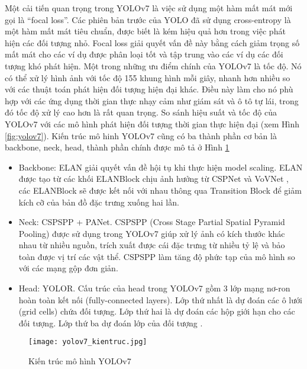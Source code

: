 \documentclass[../the.tex]{subfiles}
\begin{document}
{\fontsize{13}{12} \selectfont

	Một cải tiến quan trọng trong YOLOv7 là việc sử dụng một hàm mất mát mới gọi là “focal loss”. Các phiên bản trước của YOLO đã sử dụng cross-entropy là một hàm mất mát tiêu chuẩn, được biết là kém hiệu quả hơn trong việc phát hiện các đối tượng nhỏ. Focal loss giải quyết vấn đề này bằng cách giảm trọng số mất mát cho các ví dụ được phân loại tốt và tập trung vào các ví dụ các đối tượng khó phát hiện.
	Một trong những ưu điểm chính của YOLOv7 là tốc độ. Nó có thể xử lý hình ảnh với tốc độ 155 khung hình mỗi giây, nhanh hơn nhiều so với các thuật toán phát hiện đối tượng hiện đại khác. Điều này làm cho nó phù hợp với các ứng dụng thời gian thực nhạy cảm như giám sát và ô tô tự lái, trong đó tốc độ xử lý cao hơn là rất quan trọng.
	So sánh hiệu suất và tốc độ của YOLOv7 với các mô hình phát hiện đối tượng thời gian thực hiện đại (xem Hình \ref{fig:yolov7}).
	Kiến trúc mô hinh YOLOv7 cũng có ba thành phần cơ bản là backbone, neck, head, thành phần chính được mô tả ở Hình \ref{fig:yolov7_kientruc}

	\begin{itemize}
		\item Backbone: ELAN giải quyết vấn đề hội tụ khi thực hiện model scaling. ELAN được tạo từ các khối ELANBlock chịu ảnh hưởng từ CSPNet \cite{wang2019cspnet} và VoVNet \cite{lee2019energy}, các ELANBlock sẽ được kết nối với nhau thông qua Transition Block để giảm kích cỡ của bản đồ đặc trưng xuống hai lần.
		\item Neck: CSPSPP + PANet. CSPSPP (Cross Stage Partial Spatial Pyramid Pooling) được sử dụng trong YOLOv7 giúp xử lý ảnh có kích thước khác nhau từ nhiều nguồn, trích xuất được cái đặc trưng từ nhiều tỷ lệ và bảo toàn được vị trí các vật thể. CSPSPP làm tăng độ phức tạp của mô hình so với các mạng gộp đơn giản.
		\item Head: YOLOR. Cấu trúc của head trong YOLOv7
		      gồm 3 lớp mạng nơ-ron hoàn toàn kết nối
		      (fully-connected layers). Lớp thứ nhất
		      là dự đoán các ô lưới (grid cells) chứa đối
		      tượng. Lớp thứ hai là dự đoán các hộp giới hạn cho các đối tượng. Lớp thứ ba dự đoán lớp của đối tượng \cite{cachuayol7}.

	\end{itemize}
}

\begin{figure}[H]
	\centering
	\texttt{[image: yolov7\_kientruc.jpg]}
	\caption{Kiến trúc mô hình YOLOv7}
	\label{fig:yolov7_kientruc}
\end{figure}
\end{document}
